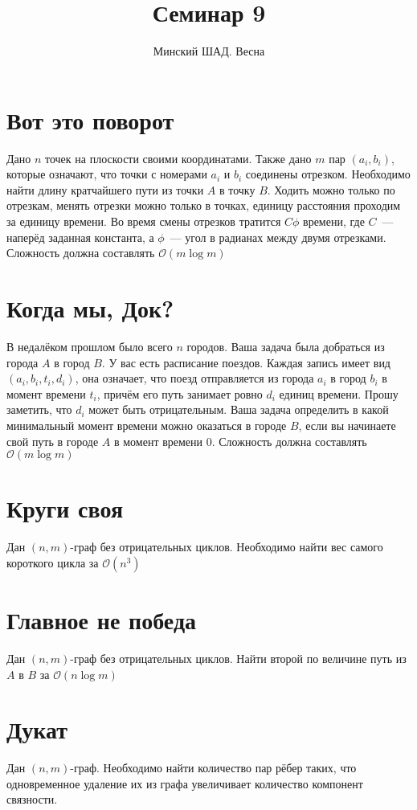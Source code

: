 \documentclass[addpoints]{exam}
\title{Семинар 9}
\author{Минский ШАД. Весна}
\begin{document}
\maketitle

\section{Вот это поворот}

Дано $n$ точек на плоскости своими координатами. Также дано $m$ пар $(a_i, b_i)$, которые означают, что точки с номерами $a_i$ и $b_i$ соединены отрезком. Необходимо найти длину кратчайшего пути из точки $A$ в точку $B$. Ходить можно только по отрезкам, менять отрезки можно только в точках, единицу расстояния проходим за единицу времени. Во время смены отрезков тратится $C \phi$ времени, где $C$~--- наперёд заданная константа, а $\phi$~--- угол в радианах между двумя отрезками. Сложность должна составлять $\mathcal{O}(m \log{m})$

\section{Когда мы, Док?}

В недалёком прошлом было всего $n$ городов. Ваша задача была добраться из города $A$ в город $B$. У вас есть расписание поездов. Каждая запись имеет вид $(a_i,b_i,t_i,d_i)$, она означает, что поезд отправляется из города $a_i$ в город $b_i$ в момент времени $t_i$, причём его путь занимает ровно $d_i$ единиц времени. Прошу заметить, что $d_i$ может быть отрицательным. Ваша задача определить в какой минимальный момент времени можно оказаться в городе $B$, если вы начинаете свой путь в городе $A$ в момент времени 0. Сложность должна составлять $\mathcal{O}(m \log{m})$

\section{Круги своя}

Дан $(n,m)$-граф без отрицательных циклов. Необходимо найти вес самого короткого цикла за $\mathcal{O}(n^3)$

\section{Главное не победа}

Дан $(n,m)$-граф без отрицательных циклов. Найти второй по величине путь из $A$ в $B$ за $\mathcal{O}(n \log{m})$

\section{Дукат}

Дан $(n,m)$-граф. Необходимо найти количество пар рёбер таких, что одновременное удаление их из графа увеличивает количество компонент связности.
\end{document}
